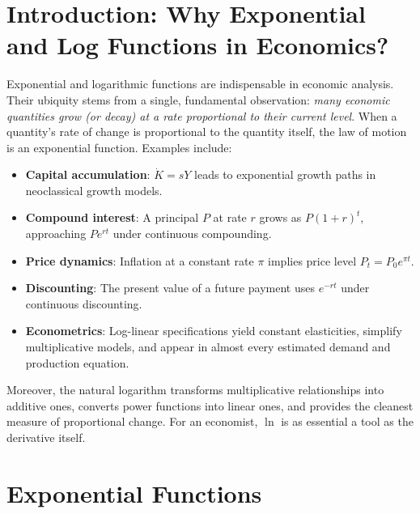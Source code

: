 \documentclass[12pt, a4paper]{article}
\theoremstyle{definition}
\begin{document}
\newpage
\tableofcontents
\newpage

\section{Introduction: Why Exponential and Log Functions in Economics?}

Exponential and logarithmic functions are indispensable in economic analysis. Their ubiquity stems from a single, fundamental observation: \emph{many economic quantities grow (or decay) at a rate proportional to their current level}. When a quantity's rate of change is proportional to the quantity itself, the law of motion is an exponential function. Examples include:

\begin{itemize}
  \item \textbf{Capital accumulation}: $\dot K = sY$ leads to exponential growth paths in neoclassical growth models.
  \item \textbf{Compound interest}: A principal $P$ at rate $r$ grows as $P(1+r)^t$, approaching $Pe^{rt}$ under continuous compounding.
  \item \textbf{Price dynamics}: Inflation at a constant rate $\pi$ implies price level $P_t = P_0 e^{\pi t}$.
  \item \textbf{Discounting}: The present value of a future payment uses $e^{-rt}$ under continuous discounting.
  \item \textbf{Econometrics}: Log-linear specifications yield constant elasticities, simplify multiplicative models, and appear in almost every estimated demand and production equation.
\end{itemize}

Moreover, the natural logarithm transforms multiplicative relationships into additive ones, converts power functions into linear ones, and provides the cleanest measure of proportional change. For an economist, $\ln$ is as essential a tool as the derivative itself.

\section{Exponential Functions}
\end{document}
